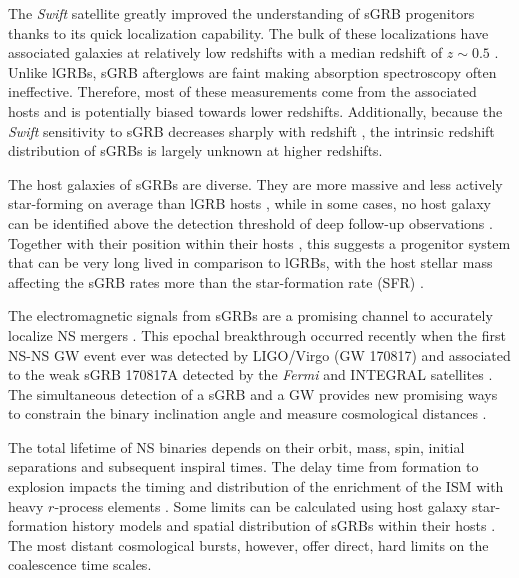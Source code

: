 \documentclass[referee]{aa}
\begin{document}
The \textit{Swift} satellite \citep{Gehrels2004} greatly improved the
understanding of sGRB progenitors thanks to its quick localization capability.
The bulk of these localizations have associated galaxies at relatively low
redshifts with a median redshift of $z\sim0.5$ \citep{Berger2014}. Unlike lGRBs,
sGRB afterglows are faint making absorption spectroscopy often ineffective.
Therefore, most of these measurements come from the associated hosts and is
potentially biased towards lower redshifts. Additionally, because the
\textit{Swift} sensitivity to sGRB decreases sharply with redshift
\citep{Behroozi2014}, the intrinsic redshift distribution of sGRBs is largely
unknown at higher redshifts.

The host galaxies of sGRBs are diverse. They are more massive and less actively
star-forming on average than lGRB hosts \citep{Fong2013b}, while in some cases,
no host galaxy can be identified above the detection threshold of deep follow-up
observations \citep{Berger2010a, Tunnicliffe2014}. Together with their position
within their hosts \citep{Fong2013a}, this suggests a progenitor system that can
be very long lived in comparison to lGRBs, with the host stellar mass affecting
the sGRB rates more than the star-formation rate (SFR) \citep{Berger2014}.

The electromagnetic signals from sGRBs are a promising channel to accurately
localize NS mergers \citep{Ghirlanda2016}. This epochal breakthrough occurred
recently when the first NS-NS GW event ever was detected by LIGO/Virgo (GW
170817) and associated to the weak sGRB 170817A detected by the \textit{Fermi}
and INTEGRAL satellites \citep{LIGOScientificCollaboration2017a, Goldstein2017,
	Savchenko2017}. The simultaneous detection of a sGRB and a GW provides new
promising ways to constrain the binary inclination angle \citep{Arun2014,
	LIGOScientificCollaboration2017a} and measure cosmological distances
\citep{Nissanke2010, LIGOScientificCollaboration2017c}.

The total lifetime of NS binaries depends on their orbit, mass, spin, initial
separations and subsequent inspiral times. The delay time from formation to
explosion impacts the timing and distribution of the enrichment of the ISM with
heavy $r$-process elements \citep{VandeVoort2015, Wallner2015,  Ji2016}. Some
limits can be calculated using host galaxy star-formation history models and
spatial distribution of sGRBs within their hosts \citep[][]{Berger2014}. The
most distant cosmological bursts, however, offer direct, hard limits on the
coalescence time scales.
\end{document}
